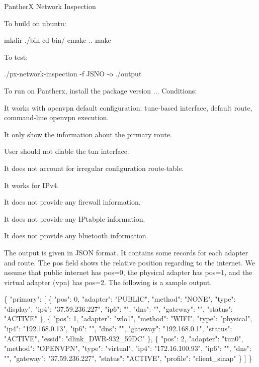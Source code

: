 PantherX Network Inspection

To build on ubuntu\+:


\begin{DoxyCode}
mkdir ./bin
cd bin/
cmake ..
make
\end{DoxyCode}


To test\+:

{\ttfamily ./px-\/network-\/inspection -\/f J\+S\+NO -\/o ./output}

To run on Pantherx, install the package version {..}. Conditions\+:


\begin{DoxyItemize}
\item It works with openvpn default configuration\+: tune-\/based interface, default route, command-\/line openvpn execution.
\item It only show the information about the pirmary route.
\item User should not diable the tun interface.
\item It does not account for irregular configuration route-\/table.
\item It works for I\+Pv4.
\item It does not provide any firewall information.
\item It does not provide any I\+Ptabple information.
\item It does not provide any bluetooth information.
\end{DoxyItemize}

The output is given in {\ttfamily J\+S\+ON} format. It contains some records for each adapter and route. The pos field shows the relative position regarding to the internet. We assume that public internet has \textquotesingle{}pos=0\textquotesingle{}, the physical adapter has {\ttfamily pos=1}, and the virtual adapter (vpn) has {\ttfamily pos=2}. The following is a sample output.


\begin{DoxyCode}
\{ "primary": [ \{ "pos": 0, "adapter": "PUBLIC", "method": "NONE", "type": "display", "ip4":
       "37.59.236.227", "ip6": "", "dns": "", "gateway": "", "status": "ACTIVE" \}, \{ "pos": 1, "adapter": "wlo1", "method":
       "WIFI", "type": "physical", "ip4": "192.168.0.13", "ip6": "", "dns": "", "gateway": "192.168.0.1", "status":
       "ACTIVE", "essid": "dlink\_DWR-932\_59DC" \}, \{ "pos": 2, "adapter": "tun0", "method": "OPENVPN", "type": "virtual",
       "ip4": "172.16.100.93", "ip6": "", "dns": "", "gateway": "37.59.236.227", "status": "ACTIVE", "profile":
       "client\_sinap" \} ] \}
\end{DoxyCode}
 